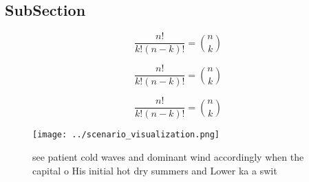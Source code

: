 \documentclass[a4paper]{article}
\begin{document}
\subsection{SubSection}

\[ \frac{n!}{k!(n-k)!} = \binom{n}{k} \]

\[ \frac{n!}{k!(n-k)!} = \binom{n}{k} \]

\[ \frac{n!}{k!(n-k)!} = \binom{n}{k} \]

\begin{figure}
\centering
\texttt{[image: ../scenario\_visualization.png]}
\caption{see patient cold waves and dominant wind accordingly when the capital o His initial hot dry summers and Lower ka a swit
}
\end{figure}
 
\end{document}
